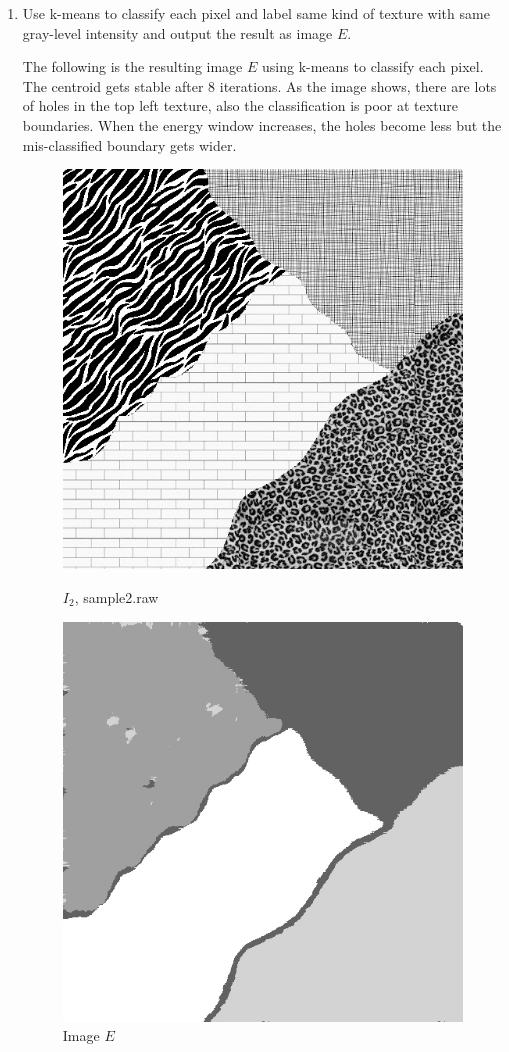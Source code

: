 \documentclass[12pt,a4paper,notitlepage,oneside,amsmath,amssymb]{article}
\begin{document}
\begin{CJK*}{UTF8}{bkai}
\begin{enumerate}[label=(\alph*)]
\item Use k-means to classify each pixel and label same kind of texture with same gray-level intensity and output the result as image \(E\).

	The following is the resulting image \(E\) using k-means to classify each pixel. The centroid gets stable after 8 iterations. As the image shows, there are lots of holes in the top left texture, also the classification is poor at texture boundaries. When the energy window increases, the holes become less but the mis-classified boundary gets wider.

	\begin{figure}[hbt!]
		\centering
		\begin{minipage}{.4\textwidth}
			\centering
			\includegraphics[width=.7\linewidth]{sample2}
			\caption*{\(I_2\), sample2.raw}
		\end{minipage}%
		\begin{minipage}{.4\textwidth}
			\centering
			\includegraphics[width=.7\linewidth]{image_E}
			\caption*{Image \(E\)}
		\end{minipage}
	\end{figure}


\end{enumerate}
\end{CJK*}
\end{document}
